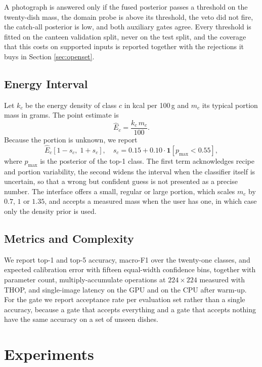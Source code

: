 \documentclass[conference]{IEEEtran}
\begin{document}
A photograph is answered only if the fused posterior passes a threshold on the
twenty-dish mass, the domain probe is above its threshold, the veto did not fire,
the catch-all posterior is low, and both auxiliary gates agree. Every threshold
is fitted on the canteen validation split, never on the test split, and the
coverage that this costs on supported inputs is reported together with the
rejections it buys in Section \ref{sec:openset}.

\subsection{Energy Interval}
\label{sec:calorie}
Let $k_c$ be the energy density of class $c$ in kcal per 100\,g and $m_c$ its
typical portion mass in grams. The point estimate is
\begin{equation}
\hat{E}_c = \frac{k_c\, m_c}{100}.
\end{equation}
Because the portion is unknown, we report
\begin{equation}
\hat{E}_c\left[1-s_c,\; 1+s_c\right], \quad
s_c = 0.15+0.10\cdot\mathbf{1}[p_{\max}<0.55],
\label{eq:interval}
\end{equation}
where $p_{\max}$ is the posterior of the top-1 class. The first term
acknowledges recipe and portion variability, the second widens the interval when
the classifier itself is uncertain, so that a wrong but confident guess is not
presented as a precise number. The interface offers a small, regular or large
portion, which scales $m_c$ by $0.7$, $1$ or $1.35$, and accepts a measured mass
when the user has one, in which case only the density prior is used.

\subsection{Metrics and Complexity}
We report top-1 and top-5 accuracy, macro-F1 over the twenty-one classes, and
expected calibration error with fifteen equal-width confidence bins, together
with parameter count, multiply-accumulate operations at $224\times224$ measured
with THOP, and single-image latency on the GPU and on the CPU after warm-up. For
the gate we report acceptance rate per evaluation set rather than a single
accuracy, because a gate that accepts everything and a gate that accepts nothing
have the same accuracy on a set of unseen dishes.

\section{Experiments}
\label{sec:exp}
\end{document}
